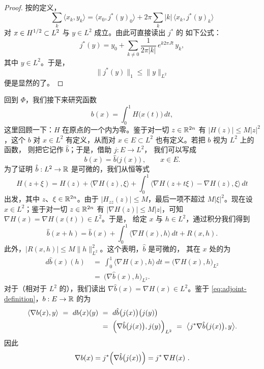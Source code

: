 \begin{proof}
按\trAdjoint{}的定义，
\[
\sum_{k}\langle x_{k},y_{k}\rangle=\bigl\langle x_{0},j^{*}(y)_{0}\bigr\rangle+%
2\pi\sum_{k}|k|\,\bigl\langle x_{k},j^{*}(y)_{k}\bigr\rangle
\]
对 $x\in H^{1/2}\subset L^{2}$ 与 $y\in L^{2}$ 成立。由此可直接读出 $j^{*}$ 的%
如下公式：
\[
j^{*}(y)=y_{0}+\sum_{k\neq0}\frac{1}{2\pi|k|}\,e^{k2\pi Jt}\,y_{k},
\]
其中 $y\in L^{2}$。于是，\trEstimate
\[
\bigl\|j^{*}(y)\bigr\|_{1}\leq\|y\|_{L^{2}}
\]
便是显然的了。
\end{proof}

回到\trFunctional{} $\Phi$，我们接下来研究函数
\[
b(x)=\int_{0}^{1}H\bigl(x(t)\bigr)\,dt,
\]
这里回顾一下：$H$ 在原点的一个\trNeighborhood{}内为零。鉴于对一切%
$z\in\mathbb{R}^{2n}$ 有 $|H(z)|\leq M|z|^{2}$，这个\trMapping{} $b$ 对 $x\in L^{2}$%
有定义，从而对 $x\in E\subset L^{2}$ 也有定义。若把 $b$ 视为 $L^{2}$ 上的函数，%
则把它记作 $\hat{b}$；于是，借助\trInclusionMapping{} $j:E\to L^{2}$，%
我们可以写成
\begin{equation}\label{eq:b-composition}
b(x)=\hat{b}\bigl(j(x)\bigr)\ ,\qquad x\in E.
\end{equation}
为了证明 $\hat{b}:L^{2}\to\mathbb{R}$ 是可微的，我们从恒等式
\begin{equation}\label{eq:h-taylor-identity}
H(z+\xi)=H(z)+\bigl\langle\nabla H(z),\xi\bigr\rangle+\int_{0}^{1}%
\bigl\langle\nabla H(z+t\xi)-\nabla H(z),\xi\bigr\rangle\,dt
\end{equation}
出发，其中 $z$、$\xi\in\mathbb{R}^{2n}$。由于 $|H_{zz}(z)|\leq M$，最后一项不超过%
$M|\xi|^{2}$。现在设 $x\in L^{2}$；鉴于对一切 $z\in\mathbb{R}^{2n}$ 有%
$|\nabla H(z)|\leq M|z|$，可知 $\nabla H(x)=\nabla H(x(t))\in L^{2}$。于是，%
给定 $x$ 与 $h\in L^{2}$，通过积分我们得到
\[
\hat{b}(x+h)=\hat{b}(x)+\int_{0}^{1}\bigl\langle\nabla H(x),h\bigr\rangle%
\,dt+R(x,h).
\]
此外，$|R(x,h)|\leq M\|h\|_{L^{2}}^{2}$。这个\trEstimate{}表明，$\hat{b}$ 是可微的，%
其在 $x$ 处的\trDerivative{}为
\begin{align*}
d\hat{b}(x)(h)\ &=\ \int_{0}^{1}\bigl\langle\nabla H(x),h\bigr\rangle\,dt=%
\bigl(\nabla H(x),h\bigr)_{L^{2}}\\
&=\ \bigl(\nabla\hat{b}(x),h\bigr)_{L^{2}}.
\end{align*}
对于（相对于 $L^{2}$ 的）\trGradient，我们读出 $\nabla\hat{b}(x)=\nabla H(x)%
\in L^{2}$。鉴于 \eqref{eq:adjoint-definition}，$b:E\to\mathbb{R}$ 的\trDerivative{}为
\begin{align*}
\langle\nabla b(x),y\rangle\ =\ db(x)(y)\ &=\ d\hat{b}\bigl(j(x)\bigr)%
\bigl(j(y)\bigr)\\
&=\ \Bigl(\nabla\hat{b}\bigl(j(x)\bigr),j(y)\Bigr)_{L^{2}}\ =\ %
\bigl\langle j^{*}\nabla\hat{b}\bigl(j(x)\bigr),y\bigr\rangle.
\end{align*}
因此
\begin{equation}\label{eq:gradient-b}
\nabla b(x)=j^{*}\Bigl(\nabla\hat{b}\bigl(j(x)\bigr)\Bigr)=j^{*}\,\nabla H(x)\ .
\end{equation}

